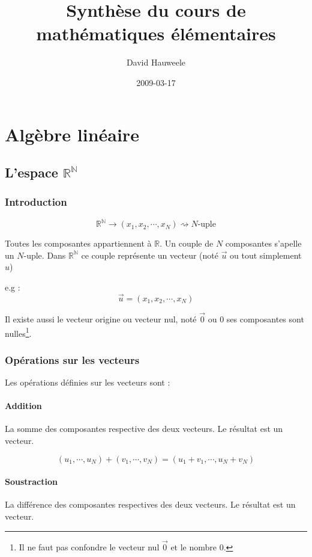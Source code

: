 \documentclass[a4paper,10pt]{report}
\author{David Hauweele}
\title{Synthèse du cours de mathématiques élémentaires}
\date{2009-03-17}
\begin{document}
\maketitle
\tableofcontents
\newpage

\chapter{Algèbre linéaire}

\section{L'espace $\mathbb{R^N}$}
\subsection{Introduction}

$$\mathbb{R^N} \rightarrow (x_1,x_2,\cdots,x_N) \rightsquigarrow N\mbox{-uple}$$

Toutes les composantes appartiennent à $\mathbb{R}$. Un couple de $N$ composantes s'apelle un $N\mbox{-uple}$. Dans $\mathbb{R^N}$ ce couple représente un vecteur (noté $\vec u$ ou tout simplement $u$)

e.g : 
$$\vec u = (x_1, x_2, \cdots, x_N)$$

Il existe aussi le vecteur origine ou vecteur nul, noté $\vec 0$ ou $0$ ses composantes sont nulles\footnote{Il ne faut pas confondre le vecteur nul $\vec 0$ et le nombre 0.}.

\subsection {Opérations sur les vecteurs}

Les opérations définies sur les vecteurs sont :

\subsubsection{Addition}
La somme des composantes respective des deux vecteurs. Le résultat est un vecteur.

$$(u_1, \cdots, u_N) + (v_1, \cdots, v_N) = (u_1 + v_1, \cdots, u_N + v_N)$$

\subsubsection{Soustraction}
La différence des composantes respectives des deux vecteurs. Le résultat est un vecteur.
\end{document}
